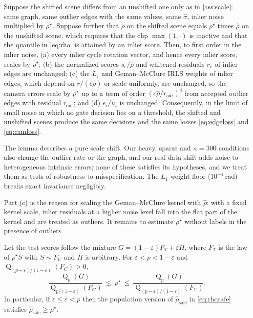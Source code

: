 \begin{lemma}\label{lem:equiv}
Suppose the shifted scene differs from an unshifted one only as in \cref{ass:scale}: same graph, same outlier edges with the same values, same $\hat\sigma$, inlier noise multiplied by $\rho^\star$. Suppose further that $\hat\rho$ on the shifted scene equals $\rho^\star$ times $\hat\rho$ on the unshifted scene, which requires that the clip $\max(1,\cdot)$ is inactive and that the quantile in \eqref{eq:rho} is attained by an inlier score. Then, to first order in the inlier noise, (a) every inlier cycle rotation vector, and hence every inlier score, scales by $\rho^\star$; (b) the normalized scores $s_e/\hat\rho$ and whitened residuals $r_e$ of inlier edges are unchanged; (c) the $L_1$ and Geman--McClure IRLS weights of inlier edges, which depend on $r/(c\hat\rho)$ or scale uniformly, are unchanged, so the camera errors scale by $\rho^\star$ up to a term of order $(c\hat\rho/r_{\mathrm{out}})^4$ from accepted outlier edges with residual $r_{\mathrm{out}}$; and (d) $e_i/u_i$ is unchanged. Consequently, in the limit of small noise in which no gate decision lies on a threshold, the shifted and unshifted scenes produce the same decisions and the same losses \eqref{eq:edgeloss} and \eqref{eq:camloss}.
\end{lemma}

The lemma describes a pure scale shift. Our heavy, sparse and $n=300$ conditions also change the outlier rate or the graph, and our real-data shift adds noise to heterogeneous intrinsic errors; none of these satisfies its hypotheses, and we treat them as tests of robustness to misspecification. The $L_1$ weight floor ($10^{-4}$\,rad) breaks exact invariance negligibly.

Part (c) is the reason for scaling the Geman--McClure kernel with $\hat\rho$: with a fixed kernel scale, inlier residuals at a higher noise level fall into the flat part of the kernel and are treated as outliers. It remains to estimate $\rho^\star$ without labels in the presence of outliers.

\begin{proposition}\label{prop:bracket}
Let the test scores follow the mixture $G=(1-\varepsilon)F_T+\varepsilon H$, where $F_T$ is the law of $\rho^\star S$ with $S\sim F_C$ and $H$ is arbitrary. For $\varepsilon<p<1-\varepsilon$ and $\operatorname{Q}_{(p-\varepsilon)/(1-\varepsilon)}(F_C)>0$,
\[
\frac{\operatorname{Q}_p(G)}{\operatorname{Q}_{p/(1-\varepsilon)}(F_C)}\ \le\ \rho^\star\ \le\ \frac{\operatorname{Q}_p(G)}{\operatorname{Q}_{(p-\varepsilon)/(1-\varepsilon)}(F_C)}.
\]
In particular, if $\varepsilon\le\bar\varepsilon<p$ then the population version of $\hat\rho_{\mathrm{safe}}$ in \eqref{eq:rhosafe} satisfies $\hat\rho_{\mathrm{safe}}\ge\rho^\star$.
\end{proposition}


